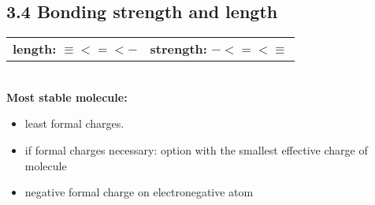 \subsection{3.4 Bonding strength and length}
    \begin{tabular}{c c}
        \textbf{length:} $\equiv < = < -$ & \textbf{strength:} $- < = < \equiv$\\
    \end{tabular}
    \vspace*{0.5em}\\
    \textbf{Most stable molecule:}
    \begin{itemize}
        \itemsep0em
        \item least formal charges.
        \item if formal charges necessary: option with the smallest effective charge of molecule
        \item negative formal charge on electronegative atom
    \end{itemize}